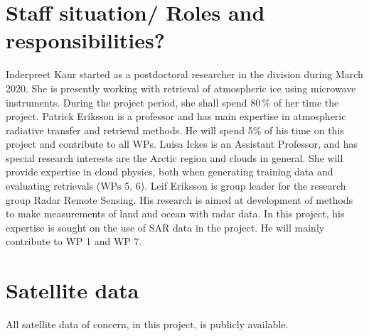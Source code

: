 \documentclass[12pt,oneside,a4paper]{article}
\begin{document}
\section{Staff situation/ Roles and responsibilities?}
\label{sec:staff}
%
Inderpreet Kaur started as a postdoctoral researcher in the division during March 2020.  She is presently working with retrieval of atmospheric ice using microwave instruments. During the project period, she shall spend 80\,\% of her time the project. Patrick Eriksson is a professor and has main expertise in atmospheric radiative transfer and retrieval methods. He will spend 5\% of his time on this project and contribute to all WPs. Luisa Ickes is an Assistant Professor, and has special research interests are the Arctic region and clouds in general. She will provide expertise in cloud physics, both when generating training data and evaluating retrievals (WPs 5, 6). Leif Eriksson is group leader for the research group Radar Remote Sensing. His research is aimed at development of methods to make measurements of land and ocean with radar data. In this project, his expertise is sought on the use of SAR data in the project. He will mainly contribute to WP 1 and WP 7. 

\section{Satellite data}
%
All satellite data of concern, in this project, is publicly available. 

{\footnotesize
	
}
\end{document}
